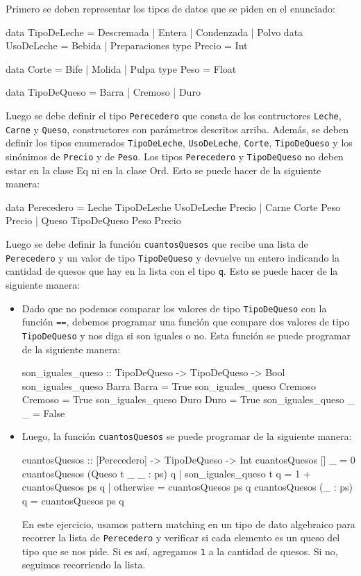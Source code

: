 \documentclass{article}
\begin{document}
\newpage
Primero se deben representar los tipos de datos que se piden en el enunciado:
\begin{haskell}
data TipoDeLeche = Descremada | Entera | Condenzada | Polvo
data UsoDeLeche = Bebida | Preparaciones
type Precio = Int

data Corte = Bife | Molida | Pulpa
type Peso = Float

data TipoDeQueso = Barra | Cremoso | Duro
\end{haskell}
Luego se debe definir el tipo \texttt{Perecedero} que consta de los contructores \texttt{Leche}, \texttt{Carne} y \texttt{Queso}, constructores con parámetros descritos arriba. Además, se deben definir los tipos enumerados \texttt{TipoDeLeche}, \texttt{UsoDeLeche}, \texttt{Corte}, \texttt{TipoDeQueso} y los sinónimos de \texttt{Precio} y de \texttt{Peso}. Los tipos \texttt{Perecedero} y \texttt{TipoDeQueso} no deben estar en la clase Eq ni en la clase Ord. Esto se puede hacer de la siguiente manera:
\begin{haskell}
data Perecedero = Leche TipoDeLeche UsoDeLeche Precio | Carne Corte Peso Precio | Queso TipoDeQueso Peso Precio
\end{haskell}
Luego se debe definir la función \texttt{cuantosQuesos} que recibe una lista de \texttt{Perecedero} y un valor de tipo \texttt{TipoDeQueso} y devuelve un entero indicando la cantidad de quesos que hay en la lista con el tipo \texttt{q}. Esto se puede hacer de la siguiente manera:
\begin{itemize}
    \item Dado que no podemos comparar los valores de tipo \texttt{TipoDeQueso} con la función \texttt{==}, debemos programar una función que compare dos valores de tipo \texttt{TipoDeQueso} y nos diga si son iguales o no. Esta función se puede programar de la siguiente manera:
    \begin{haskell}
    son_iguales_queso :: TipoDeQueso -> TipoDeQueso -> Bool
    son_iguales_queso Barra Barra = True
    son_iguales_queso Cremoso Cremoso = True
    son_iguales_queso Duro Duro = True
    son_iguales_queso _ _ = False
    \end{haskell}
    \item Luego, la función \texttt{cuantosQuesos} se puede programar de la siguiente manera:
    \begin{haskell}
    cuantosQuesos :: [Perecedero] -> TipoDeQueso -> Int
    cuantosQuesos [] _ = 0
    cuantosQuesos (Queso t _ _ : ps) q
        | son_iguales_queso t q = 1 + cuantosQuesos ps q
        | otherwise = cuantosQuesos ps q
    cuantosQuesos (_ : ps) q = cuantosQuesos ps q
    \end{haskell}
    En este ejercicio, usamos pattern matching en un tipo de dato algebraico para recorrer la lista de \texttt{Perecedero} y verificar si cada elemento es un queso del tipo que se nos pide. Si es así, agregamos \texttt{1} a la cantidad de quesos. Si no, seguimos recorriendo la lista.
\end{itemize}
\end{document}
